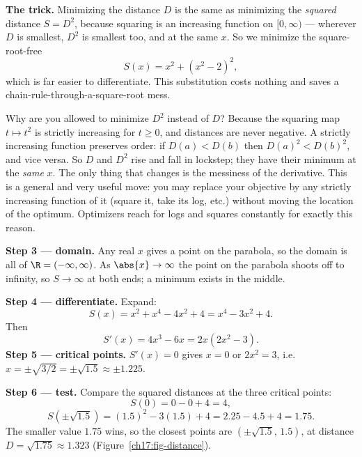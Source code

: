 \textbf{The trick.} Minimizing the distance $D$ is the same as minimizing the
\emph{squared} distance $S = D^2$, because squaring is an increasing function on
$[0,\infty)$ --- wherever $D$ is smallest, $D^2$ is smallest too, and at the same
$x$. So we minimize the square-root-free
\[
S(x) = x^2 + (x^2 - 2)^2,
\]
which is far easier to differentiate. This substitution costs nothing and saves a
chain-rule-through-a-square-root mess.

\begin{whybox}
Why are you allowed to minimize $D^2$ instead of $D$? Because the squaring map
$t\mapsto t^2$ is strictly increasing for $t\ge 0$, and distances are never negative.
A strictly increasing function preserves order: if $D(a) < D(b)$ then $D(a)^2 <
D(b)^2$, and vice versa. So $D$ and $D^2$ rise and fall in lockstep; they have their
minimum at the \emph{same} $x$. The only thing that changes is the messiness of the
derivative. This is a general and very useful move: you may replace your objective by
any strictly increasing function of it (square it, take its log, etc.) without moving
the location of the optimum. Optimizers reach for logs and squares constantly for
exactly this reason.
\end{whybox}

\textbf{Step 3 --- domain.} Any real $x$ gives a point on the parabola, so the domain
is all of $\R = (-\infty, \infty)$. As $\abs{x}\to\infty$ the point on the parabola
shoots off to infinity, so $S\to\infty$ at both ends; a minimum exists in the middle.

\textbf{Step 4 --- differentiate.} Expand:
\[
S(x) = x^2 + x^4 - 4x^2 + 4 = x^4 - 3x^2 + 4.
\]
Then
\[
S'(x) = 4x^3 - 6x = 2x(2x^2 - 3).
\]
\textbf{Step 5 --- critical points.} $S'(x)=0$ gives $x=0$ or $2x^2=3$, i.e.\
$x = \pm\sqrt{3/2} = \pm\sqrt{1.5} \approx \pm 1.225$.

\textbf{Step 6 --- test.} Compare the squared distances at the three critical points:
\[
S(0) = 0 - 0 + 4 = 4,
\]
\[
S\!\left(\pm\sqrt{1.5}\right) = (1.5)^2 - 3(1.5) + 4 = 2.25 - 4.5 + 4 = 1.75.
\]
The smaller value $1.75$ wins, so the closest points are
$\left(\pm\sqrt{1.5},\, 1.5\right)$, at distance $D = \sqrt{1.75} \approx 1.323$
(Figure~\ref{ch17:fig-distance}).

